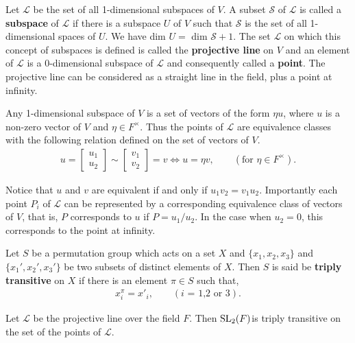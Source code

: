 \begin{definition} 
    Let $\mathscr{L}$ be the set of all 1-dimensional subspaces of $V$. A subset $\mathscr{S}$ of $\mathscr{L}$ is called a \textbf{subspace} of $\mathscr{L}$ if there is a subspace $U$ of $V$ such that $\mathscr{S}$ is the set of all 1-dimensional spaces of $U$. We have dim $U =$ dim $\mathscr{S} + 1$. The set $\mathscr{L}$ on which this concept of subspaces is defined is called the \textbf{projective line} on $V$ and an element of $\mathscr{L}$ is a 0-dimensional subspace of $\mathscr{L}$ and consequently called a \textbf{point}. The projective line can be considered as a straight line in the field, plus a point at infinity.
\end{definition}

Any 1-dimensional subspace of $V$ is a set of vectors of the form $\eta u$, where $u$ is a non-zero vector of $V$ and $\eta \in F^\times$. Thus the points of $\mathscr{L}$ are equivalence classes with the following relation defined on the set of vectors of $V$.
\begin{align*} u = \begin{bmatrix} u_1 \\ u_2 \end{bmatrix} \sim \begin{bmatrix} v_1 \\ v_2 \end{bmatrix} = v \iff u = \eta v, \qquad (\text{for $\eta \in F^\times$}).
\end{align*}

Notice that $u$ and $v$ are equivalent if and only if $u_1 v_2 = v_1 u_2$. Importantly each point $P_i$ of $\mathscr{L}$ can be represented by a corresponding equivalence class of vectors of $V$, that is, $P$ corresponds to $u$ if $P = u_1 / u_2$. In the case when $u_2 = 0$, this corresponds to the point at infinity.

\begin{definition} Let $S$ be a permutation group which acts on a set $X$ and $\{ x_1, x_2, x_3 \}$ and $\{ x_1', x_2', x_3' \}$ be two subsets of distinct elements of $X$. Then $S$ is said be \textbf{triply transitive} on $X$ if there is an element $\pi \in S$ such that,
\begin{align*} x^{\pi}_i = x'_i, \qquad(\text{$i$ = 1,2 or 3}).
\end{align*} 
\end{definition}

\begin{theorem} \label{6.6}
Let $\mathscr{L}$ be the projective line over the field $F$. Then $\operatorname{SL}_2(F)$is triply transitive on the set of the points of $\mathscr{L}$. \vspace{3mm}
\end{theorem}


